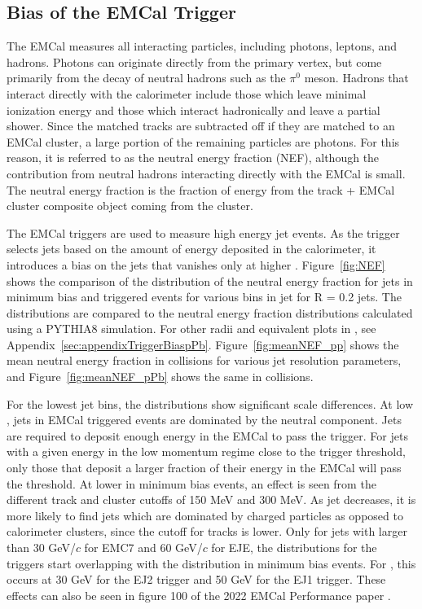 \subsection{Bias of the EMCal Trigger}
\label{sec:EMCTriggerBias}

The EMCal measures all interacting particles, including photons, leptons, and hadrons. Photons can originate directly from the primary vertex, but come primarily from the decay of neutral hadrons such as the $\pi^0$ meson. Hadrons that interact directly with the calorimeter include those which leave minimal ionization energy and those which interact hadronically and leave a partial shower. Since the matched tracks are subtracted off if they are matched to an EMCal cluster, a large portion of the remaining particles are photons. For this reason, it is referred to as the neutral energy fraction (NEF), although the contribution from neutral hadrons interacting directly with the EMCal is small. The neutral energy fraction is the fraction of energy from the track + EMCal cluster composite object coming from the cluster.

The EMCal triggers are used to measure high energy jet events. As the trigger selects jets based on the amount of energy deposited in the calorimeter, it introduces a bias on the jets that vanishes only at higher \pT. Figure~\ref{fig:NEF} shows the comparison of the distribution of the neutral energy fraction for \pp jets in minimum bias and triggered events for various bins in jet \pT for R = 0.2 jets. The distributions are compared to the neutral energy fraction distributions calculated using a PYTHIA8 simulation. For other radii and equivalent plots in \pPb, see Appendix~\ref{sec:appendixTriggerBiaspPb}. Figure~\ref{fig:meanNEF_pp} shows the mean neutral energy fraction in \pp collisions for various jet resolution parameters, and Figure~\ref{fig:meanNEF_pPb} shows the same in \pPb collisions.

For the lowest jet \pT bins, the distributions show significant scale differences. At low \pT, jets in EMCal triggered events are dominated by the neutral component. Jets are required to deposit enough energy in the EMCal to pass the trigger. For jets with a given energy in the low momentum regime close to the trigger threshold, only those that deposit a larger fraction of their energy in the EMCal will pass the threshold. At lower \pT in minimum bias events, an effect is seen from the different track and cluster \pT cutoffs of 150 MeV and 300 MeV. As jet \pT decreases, it is more likely to find jets which are dominated by charged particles as opposed to calorimeter clusters, since the cutoff for tracks is lower. Only for jets with \pT larger than 30 GeV/$c$ for EMC7 and 60 GeV/$c$ for EJE, the distributions for the triggers start overlapping with the distribution in minimum bias events. For \pPb, this occurs at 30 GeV for the EJ2 trigger and 50 GeV for the EJ1 trigger. These effects can also be seen in figure 100 of the 2022 EMCal Performance paper \cite{EMCalPerformance}.

